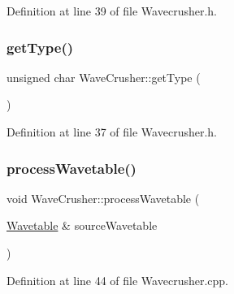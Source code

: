 Definition at line 39 of file Wavecrusher.\+h.

\mbox{\label{class_wave_crusher_a2bb40dc158e5e3358b632572ba2eb7c3}} 
\subsubsection{\texorpdfstring{get\+Type()}{getType()}}
{\footnotesize\ttfamily unsigned char Wave\+Crusher\+::get\+Type (\begin{DoxyParamCaption}{ }\end{DoxyParamCaption})\hspace{0.3cm}{\ttfamily [inline]}}



Definition at line 37 of file Wavecrusher.\+h.

\mbox{\label{class_wave_crusher_a906f0056db9847e6fafd406ab9e613a9}} 
\subsubsection{\texorpdfstring{process\+Wavetable()}{processWavetable()}}
{\footnotesize\ttfamily void Wave\+Crusher\+::process\+Wavetable (\begin{DoxyParamCaption}\item[{\hyperlink{class_wavetable}{Wavetable} \&}]{source\+Wavetable }\end{DoxyParamCaption})}



Definition at line 44 of file Wavecrusher.\+cpp.

